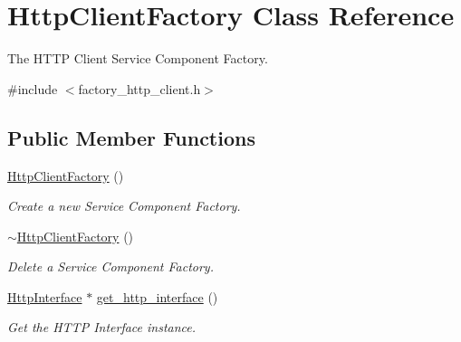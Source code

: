 \hypertarget{classHttpClientFactory}{}\section{Http\+Client\+Factory Class Reference}
\label{classHttpClientFactory}


The H\+T\+TP Client Service Component Factory.  




{\ttfamily \#include $<$factory\+\_\+http\+\_\+client.\+h$>$}

\subsection*{Public Member Functions}
\begin{DoxyCompactItemize}
\item 
\hyperlink{classHttpClientFactory_a9e8dee5f95e0e1bca57bf18e44c6b50c}{Http\+Client\+Factory} ()\hypertarget{classHttpClientFactory_a9e8dee5f95e0e1bca57bf18e44c6b50c}{}\label{classHttpClientFactory_a9e8dee5f95e0e1bca57bf18e44c6b50c}

\begin{DoxyCompactList}\small\item\em Create a new Service Component Factory. \end{DoxyCompactList}\item 
\hyperlink{classHttpClientFactory_ad8933417b67619d6ad3544fd8c5e377e}{$\sim$\+Http\+Client\+Factory} ()\hypertarget{classHttpClientFactory_ad8933417b67619d6ad3544fd8c5e377e}{}\label{classHttpClientFactory_ad8933417b67619d6ad3544fd8c5e377e}

\begin{DoxyCompactList}\small\item\em Delete a Service Component Factory. \end{DoxyCompactList}\item 
\hyperlink{classHttpInterface}{Http\+Interface} $\ast$ \hyperlink{classHttpClientFactory_a5c9e9316e053d700ef182b08299172be}{get\+\_\+http\+\_\+interface} ()\hypertarget{classHttpClientFactory_a5c9e9316e053d700ef182b08299172be}{}\label{classHttpClientFactory_a5c9e9316e053d700ef182b08299172be}

\begin{DoxyCompactList}\small\item\em Get the H\+T\+TP Interface instance. \end{DoxyCompactList}\end{DoxyCompactItemize}


